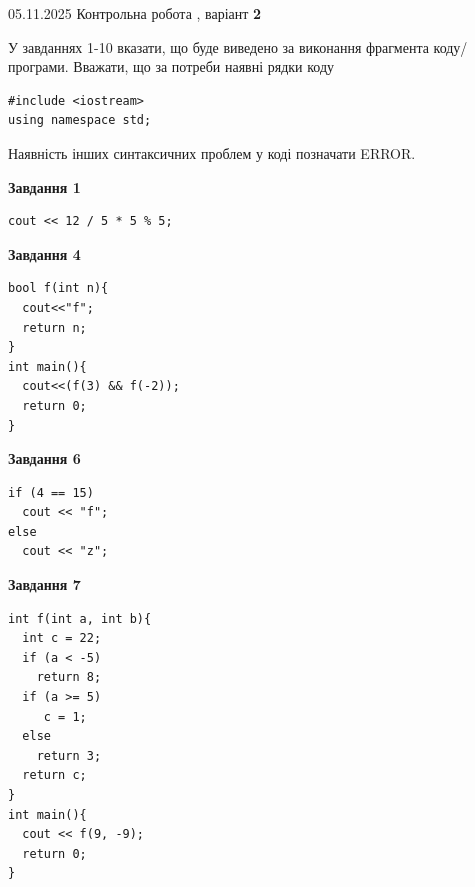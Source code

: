 \documentclass[12pt, ukrainian]{article}
\begin{document}
{\Large{05.11.2025 Контрольна робота , варіант  \No \textbf { 2 }\par}}
{
\begin {large}
У завданнях 1-10 вказати, що буде виведено за виконання фрагмента коду/про\-гра\-ми.
Вважати, що за потреби наявні рядки коду
\begin{verbatim}
#include <iostream>
using namespace std;
\end{verbatim}
Наявність інших синтаксичних проблем у коді позначати ERROR.

\begin{minipage}[t]{7.0cm}

\begin{center}
\textbf{Завдання 1}
\end{center}
\vspace{-8mm}

\begin{verbatim}
cout << 12 / 5 * 5 % 5;
\end{verbatim}



\begin{center}
\textbf{Завдання 4}
\end{center}
\vspace{-8mm}

\begin{verbatim}
bool f(int n){
  cout<<"f";
  return n;
}
int main(){
  cout<<(f(3) && f(-2));
  return 0;
}
\end{verbatim}



\begin{center}
\textbf{Завдання 6}
\end{center}
\vspace{-8mm}

\begin{verbatim}
if (4 == 15)
  cout << "f";
else
  cout << "z";
\end{verbatim}



\begin{center}
\textbf{Завдання 7}
\end{center}
\vspace{-8mm}

\begin{verbatim}
int f(int a, int b){
  int c = 22;
  if (a < -5)
    return 8;
  if (a >= 5)
     c = 1;
  else
    return 3;
  return c;
}
int main(){
  cout << f(9, -9);
  return 0;
}
\end{verbatim}


\end{minipage}
\end{large}}
\end{document}
